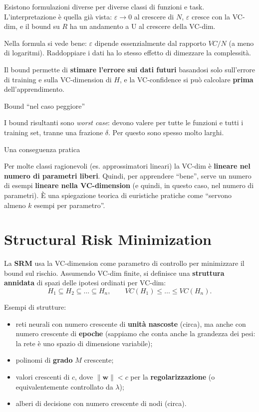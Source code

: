 Esistono formulazioni diverse per diverse classi di funzioni e task.
L'interpretazione è quella già vista: \(\varepsilon \to 0\) al crescere
di \(N\), \(\varepsilon\) cresce con la VC-dim, e il bound su \(R\) ha
un andamento a U al crescere della VC-dim.

Nella formula si vede bene: \(\varepsilon\) dipende essenzialmente dal
rapporto \(VC/N\) (a meno di logaritmi). Raddoppiare i dati ha lo stesso
effetto di dimezzare la complessità.

Il bound permette di \textbf{stimare l'errore sui dati futuri} basandosi
solo sull'errore di training e sulla VC-dimension di \(H\), e la
VC-confidence si può calcolare \textbf{prima} dell'apprendimento.

\begin{boxwarning}{Bound ``nel caso peggiore''}

I bound risultanti sono \emph{worst case}: devono valere per tutte le
funzioni e tutti i training set, tranne una frazione \(\delta\). Per
questo sono spesso molto larghi.

\end{boxwarning}

\begin{boxtip}{Una conseguenza pratica}

Per molte classi ragionevoli (es. approssimatori lineari) la VC-dim è
\textbf{lineare nel numero di parametri liberi}. Quindi, per apprendere
``bene'', serve un numero di esempi \textbf{lineare nella VC-dimension}
(e quindi, in questo caso, nel numero di parametri). È una spiegazione
teorica di euristiche pratiche come ``servono almeno \(k\) esempi per
parametro''.

\end{boxtip}

\section{Structural Risk
Minimization}\label{structural-risk-minimization}

La \textbf{SRM} usa la VC-dimension come parametro di controllo per
minimizzare il bound sul rischio. Assumendo VC-dim finite, si definisce
una \textbf{struttura annidata} di spazi delle ipotesi ordinati per
VC-dim: \[
H_1 \subseteq H_2 \subseteq \dots \subseteq H_n, \qquad VC(H_1) \le \dots \le VC(H_n).
\]

Esempi di strutture:

\begin{itemize}
\tightlist
\item
  reti neurali con numero crescente di \textbf{unità nascoste} (circa),
  ma anche con numero crescente di \textbf{epoche} (sappiamo che conta
  anche la grandezza dei pesi: la rete è uno spazio di dimensione
  variabile);
\item
  polinomi di \textbf{grado} \(M\) crescente;
\item
  valori crescenti di \(c\), dove \(\|\mathbf{w}\| < c\) per la
  \textbf{regolarizzazione} (o equivalentemente controllato da
  \(\lambda\));
\item
  alberi di decisione con numero crescente di nodi (circa).
\end{itemize}

